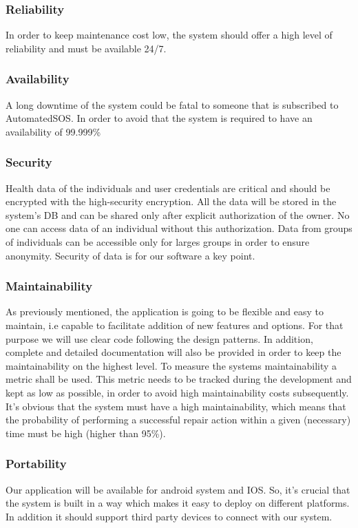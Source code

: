 \documentclass[12pt]{article}
\begin{document}
\subsubsection{Reliability}
In order to keep maintenance cost low, the system should offer a high level of reliability and must be available 24/7.

\subsubsection{Availability}
A long downtime of the system could be fatal to someone that is subscribed to AutomatedSOS. In order to avoid that the system is required to have an availability of 99.999\%
\subsubsection{Security}
Health data of the individuals and user credentials are critical and should be encrypted with the high-security encryption. All the data will be stored in the system's DB and can be shared only after explicit authorization of the owner. No one can access data of an individual without this authorization. Data from groups of individuals can be accessible only for larges groups in order to ensure anonymity. Security of data is for our software a key point.
\subsubsection{Maintainability}
As previously mentioned, the application is going to be flexible and easy to maintain, i.e capable to
facilitate addition of new features and options. For that purpose we will use clear code following the
design patterns. In addition, complete and detailed documentation will also be provided in order to keep the
maintainability on the highest level.
To measure the systems maintainability a metric shall be used. This metric needs to be tracked during the development and kept as low as possible, in order to avoid high maintainability costs subsequently. It’s obvious that the system must have a high maintainability, which means that the probability of performing a successful repair action within a given (necessary) time must be high (higher than 95\%).

\subsubsection{Portability}
Our application will be available for android system and IOS. So, it’s crucial that the system is built in a way which makes it easy to deploy on different platforms. In addition it should support third party devices to connect with our system.
\newpage
\end{document}
